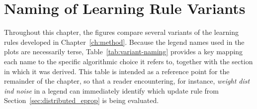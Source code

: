 \section{Naming of Learning Rule Variants}
\label{sec:variant-naming}

Throughout this chapter, the figures compare several variants of the learning
rules developed in Chapter~\ref{ch:method}. Because the legend names used
in the plots are necessarily terse, Table~\ref{tab:variant-naming} provides a
key mapping each name to the specific algorithmic choice it refers to, together
with the section in which it was derived. This table is intended as a reference
point for the remainder of the chapter, so that a reader encountering, for
instance, \emph{weight dist ind noise} in a legend can immediately
identify which update rule from Section~\ref{sec:distributed_eprop} is being
evaluated.



